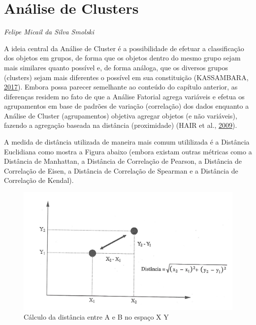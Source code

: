 \documentclass[12pt,brazil,oneside]{book}
\begin{document}
\hypertarget{analise-de-clusters}{%
\chapter{Análise de Clusters}\label{analise-de-clusters}}

\emph{Felipe Micail da Silva Smolski}

\begin{flushright}
\emph{}
\end{flushright}

A ideia central da Análise de Cluster é a possibilidade de efetuar a classificação dos objetos em grupos, de forma que os objetos dentro do mesmo grupo sejam mais similares quanto possível e, de forma análoga, que os diversos grupos (clusters) sejam mais diferentes o possível em sua constituição (KASSAMBARA, \protect\hyperlink{ref-Kassambara2017}{2017}). Embora possa parecer semelhante ao conteúdo do capítulo anterior, as diferenças residem no fato de que a Análise Fatorial agrega variáveis e efetua os agrupamentos em base de padrões de variação (correlação) dos dados enquanto a Análise de Cluster (agrupamentos) objetiva agregar objetos (e não variáveis), fazendo a agregação baseada na distância (proximidade) (HAIR et al., \protect\hyperlink{ref-Hair2009}{2009}).

A medida de distância utilizada de maneira mais comum utililizada é a Distância Euclidiana como mostra a Figura abaixo (embora existam outras métricas como a Distância de Manhattan, a Distância de Correlação de Pearson, a Distância de Correlação de Eisen, a Distância de Correlação de Spearman e a Distância de Correlação de Kendal).

\begin{figure}[H]

{\centering \includegraphics[width=0.8\linewidth]{distecludiana} 

}

\caption{Cálculo da distância entre A e B no espaço X Y}\label{fig:unnamed-chunk-35}
\end{figure}
\end{document}
